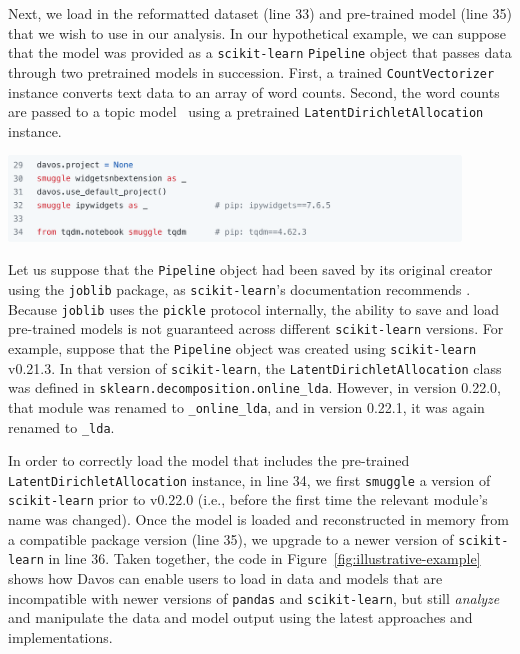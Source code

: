 \documentclass[preprint,12pt,a4paper]{elsarticle}
\begin{document}
Next, we load in the reformatted dataset (line 33) and pre-trained
model (line 35) that we wish to use in our analysis.  In our
hypothetical example, we can suppose that the model was provided as a
\texttt{scikit-learn} \texttt{Pipeline} object that passes data
through two pretrained models in succession.  First, a trained \texttt{CountVectorizer}
instance converts text data to an array of word counts.  Second, the
word counts are passed to a topic model~\cite{BleiEtal03} using a
pretrained \texttt{LatentDirichletAllocation} instance.
\begin{center}
\includegraphics[width=0.9\textwidth]{figs/example7}
\end{center}
Let us suppose that the \texttt{Pipeline} object had been saved by its
original creator using the \texttt{joblib} package, as
\texttt{scikit-learn}'s documentation recommends \cite{skle22}.  Because
\texttt{joblib} uses the \texttt{pickle} protocol internally, the
ability to save and load pre-trained models is not guaranteed across
different \texttt{scikit-learn} versions.  For example, suppose that
the \texttt{Pipeline} object was created using \texttt{scikit-learn}
v0.21.3.  In that version of \texttt{scikit-learn}, the
\texttt{LatentDirichletAllocation} class was defined in
\texttt{sklearn.decomposition.online\_lda}.  However, in version
0.22.0, that module was renamed to \texttt{\_online\_lda}, and in
version 0.22.1, it was again renamed to \texttt{\_lda}.

In order to correctly load the model that includes the pre-trained
\texttt{LatentDirichlet\-Allocation} instance, in line 34, we first
\texttt{smuggle} a version of \texttt{scikit-learn} prior to v0.22.0 (i.e.,
before the first time the relevant module's name was changed).  Once
the model is loaded and reconstructed in memory from a compatible
package version (line 35), we upgrade to a newer version of
\texttt{scikit-learn} in line 36.  Taken together, the code in
Figure~\ref{fig:illustrative-example} shows how Davos can
enable users to load in data and models that are incompatible with
newer versions of \texttt{pandas} and \texttt{scikit-learn}, but still
\textit{analyze} and manipulate the data and model output using the
latest approaches and implementations.
\end{document}
